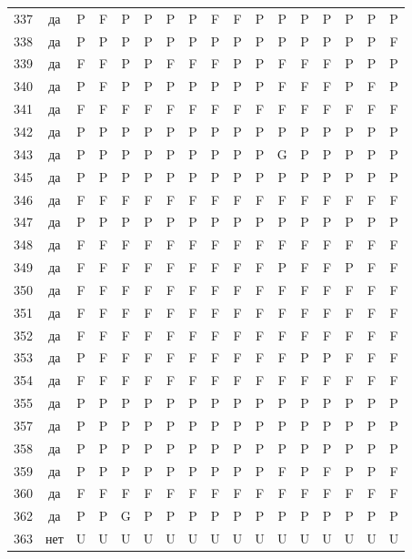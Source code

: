\begin{table}[p]
\begin{tabular*}{\textwidth}{@{\extracolsep{\fill}}rcccccccccccccccc}
337 & да & P & F & P & P & P & P & F & F & P & P & P & P & P & P & P\\
338 & да & P & P & P & P & P & P & P & P & P & P & P & P & P & P & F\\
339 & да & F & F & P & P & F & F & F & P & P & F & F & F & P & P & P\\
340 & да & P & F & P & P & P & P & P & P & P & F & F & F & P & F & P\\
341 & да & F & F & F & F & F & F & F & F & F & F & F & F & F & F & F\\
342 & да & P & P & P & P & P & P & P & P & P & P & P & P & P & P & P\\
343 & да & P & P & P & P & P & P & P & P & P & G & P & P & P & P & P\\
345 & да & P & P & P & P & P & P & P & P & P & P & P & P & P & P & P\\
346 & да & F & F & F & F & F & F & F & F & F & F & F & F & F & F & F\\
347 & да & P & P & P & P & P & P & P & P & P & P & P & P & P & P & P\\
348 & да & F & F & F & F & F & F & F & F & F & F & F & F & F & F & F\\
349 & да & F & F & F & F & F & F & F & F & F & P & F & F & P & F & F\\
350 & да & F & F & F & F & F & F & F & F & F & F & F & F & F & F & F\\
351 & да & F & F & F & F & F & F & F & F & F & F & F & F & F & F & F\\
352 & да & F & F & F & F & F & F & F & F & F & F & F & F & F & F & F\\
353 & да & P & F & F & F & F & F & F & F & F & F & P & P & F & F & F\\
354 & да & F & F & F & F & F & F & F & F & F & F & F & F & F & F & F\\
355 & да & P & P & P & P & P & P & P & P & P & P & P & P & P & P & P\\
357 & да & P & P & P & P & P & P & P & P & P & P & P & P & P & P & P\\
358 & да & P & P & P & P & P & P & P & P & P & P & P & P & P & P & P\\
359 & да & P & P & P & P & P & P & P & P & P & F & P & F & P & P & F\\
360 & да & F & F & F & F & F & F & F & F & F & F & F & F & F & F & F\\
362 & да & P & P & G & P & P & P & P & P & P & P & P & P & P & P & P\\
363 & нет & U & U & U & U & U & U & U & U & U & U & U & U & U & U & U\\
\bottomrule\end{tabular*}\end{table}
\clearpage

